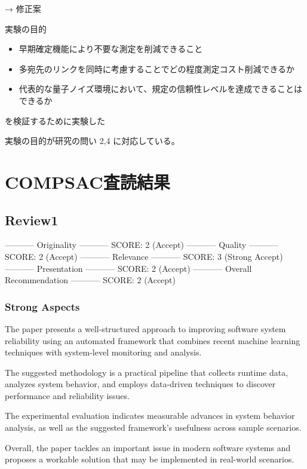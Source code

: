 \documentclass[conference]{IEEEtran}
\begin{document}
→ 修正案

実験の目的

\begin{itemize}
\item 早期確定機能により不要な測定を削減できること

\item 多宛先のリンクを同時に考慮することでどの程度測定コスト削減できるか

\item 代表的な量子ノイズ環境において、規定の信頼性レベルを達成できることは
できるか
\end{itemize}

を検証するために実験した






実験の目的が研究の問い 2,4 に対応している。



\section{COMPSAC査読結果}
\label{sec:org7acd881}
\subsection{Review1}
\label{sec:org3dc74f2}
----------- Originality -----------
SCORE: 2 (Accept)
----------- Quality -----------
SCORE: 2 (Accept)
----------- Relevance -----------
SCORE: 3 (Strong Accept)
----------- Presentation -----------
SCORE: 2 (Accept)
----------- Overall Recommendation -----------
SCORE: 2 (Accept)


\subsubsection{Strong Aspects}
\label{sec:org4a75cd1}
The paper presents a well-structured approach to improving software
system reliability using an automated framework that combines recent
machine learning techniques with system-level monitoring and analysis.

The suggested methodology is a practical pipeline that
collects runtime data, analyzes system behavior, and employs
data-driven techniques to discover performance and reliability
issues.

The experimental evaluation indicates measurable advances in
system behavior analysis, as well as the suggested framework's
usefulness across sample scenarios.

Overall, the paper tackles an important issue in modern software
systems and proposes a workable solution that may be implemented in
real-world scenarios.
\end{document}
